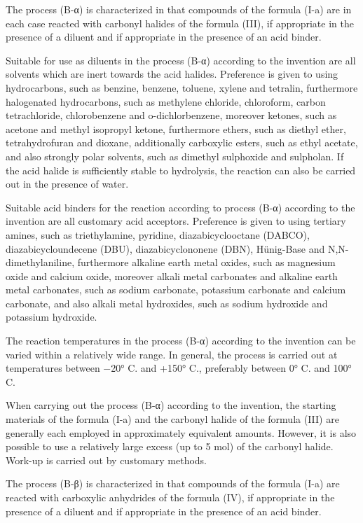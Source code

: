 \documentclass[11pt,a4paper]{article}
\begin{document}
The process (B-α) is characterized in that compounds of the formula (I-a) are in each case reacted with carbonyl halides of the formula (III), if appropriate in the presence of a diluent and if appropriate in the presence of an acid binder.

Suitable for use as diluents in the process (B-α) according to the invention are all solvents which are inert towards the acid halides. Preference is given to using hydrocarbons, such as benzine, benzene, toluene, xylene and tetralin, furthermore halogenated hydrocarbons, such as methylene chloride, chloroform, carbon tetrachloride, chlorobenzene and o-dichlorbenzene, moreover ketones, such as acetone and methyl isopropyl ketone, furthermore ethers, such as diethyl ether, tetrahydrofuran and dioxane, additionally carboxylic esters, such as ethyl acetate, and also strongly polar solvents, such as dimethyl sulphoxide and sulpholan. If the acid halide is sufficiently stable to hydrolysis, the reaction can also be carried out in the presence of water.

Suitable acid binders for the reaction according to process (B-α) according to the invention are all customary acid acceptors. Preference is given to using tertiary amines, such as triethylamine, pyridine, diazabicyclooctane (DABCO), diazabicycloundecene (DBU), diazabicyclononene (DBN), Hünig-Base and N,N-dimethylaniline, furthermore alkaline earth metal oxides, such as magnesium oxide and calcium oxide, moreover alkali metal carbonates and alkaline earth metal carbonates, such as sodium carbonate, potassium carbonate and calcium carbonate, and also alkali metal hydroxides, such as sodium hydroxide and potassium hydroxide.

The reaction temperatures in the process (B-α) according to the invention can be varied within a relatively wide range. In general, the process is carried out at temperatures between −20° C. and +150° C., preferably between 0° C. and 100° C.

When carrying out the process (B-α) according to the invention, the starting materials of the formula (I-a) and the carbonyl halide of the formula (III) are generally each employed in approximately equivalent amounts. However, it is also possible to use a relatively large excess (up to 5 mol) of the carbonyl halide. Work-up is carried out by customary methods.

The process (B-β) is characterized in that compounds of the formula (I-a) are reacted with carboxylic anhydrides of the formula (IV), if appropriate in the presence of a diluent and if appropriate in the presence of an acid binder.
\end{document}

